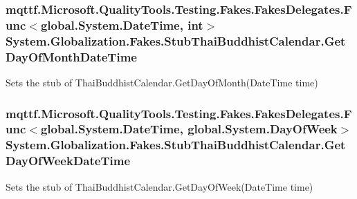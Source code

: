 \hypertarget{class_system_1_1_globalization_1_1_fakes_1_1_stub_thai_buddhist_calendar_a67fad3bb8aff7f496a82ef05b2d9b337}{
\subsubsection[{Get\-Day\-Of\-Month\-Date\-Time}]{\setlength{\rightskip}{0pt plus 5cm}mqttf.\-Microsoft.\-Quality\-Tools.\-Testing.\-Fakes.\-Fakes\-Delegates.\-Func$<$global.\-System.\-Date\-Time, int$>$ System.\-Globalization.\-Fakes.\-Stub\-Thai\-Buddhist\-Calendar.\-Get\-Day\-Of\-Month\-Date\-Time}}\label{class_system_1_1_globalization_1_1_fakes_1_1_stub_thai_buddhist_calendar_a67fad3bb8aff7f496a82ef05b2d9b337}


Sets the stub of Thai\-Buddhist\-Calendar.\-Get\-Day\-Of\-Month(\-Date\-Time time)

\hypertarget{class_system_1_1_globalization_1_1_fakes_1_1_stub_thai_buddhist_calendar_a1f4f046848165509b6b4c45e487a8f4a}{
\subsubsection[{Get\-Day\-Of\-Week\-Date\-Time}]{\setlength{\rightskip}{0pt plus 5cm}mqttf.\-Microsoft.\-Quality\-Tools.\-Testing.\-Fakes.\-Fakes\-Delegates.\-Func$<$global.\-System.\-Date\-Time, global.\-System.\-Day\-Of\-Week$>$ System.\-Globalization.\-Fakes.\-Stub\-Thai\-Buddhist\-Calendar.\-Get\-Day\-Of\-Week\-Date\-Time}}\label{class_system_1_1_globalization_1_1_fakes_1_1_stub_thai_buddhist_calendar_a1f4f046848165509b6b4c45e487a8f4a}


Sets the stub of Thai\-Buddhist\-Calendar.\-Get\-Day\-Of\-Week(\-Date\-Time time)

